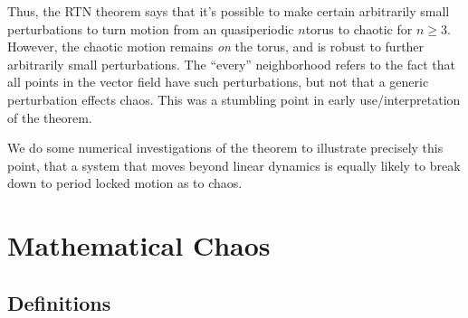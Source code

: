 \documentclass[12pt]{article}
\begin{document}
Thus, the RTN theorem says that it's possible to make certain arbitrarily small
perturbations to turn motion from an quasiperiodic $n$torus to chaotic for $n
\geq 3$. However, the chaotic motion remains \emph{on} the torus, and is robust
to further arbitrarily small perturbations. The ``every'' neighborhood refers to
the fact that all points in the vector field have such perturbations, but not
that a generic perturbation effects chaos. This was a stumbling point in early
use/interpretation of the theorem.

We do some numerical investigations of the theorem to illustrate precisely this
point, that a system that moves beyond linear dynamics is equally likely to
break down to period locked motion as to chaos.

\clearpage

\section{Mathematical Chaos}

\subsection{Definitions}
\end{document}
